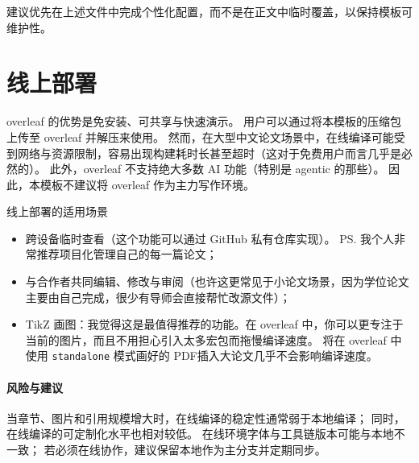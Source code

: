 建议优先在上述文件中完成个性化配置，而不是在正文中临时覆盖，以保持模板可维护性。

\section{线上部署}

\gls{overleaf} 的优势是免安装、可共享与快速演示。
用户可以通过将本模板的压缩包上传至 \gls{overleaf} 并解压来使用。
然而，在大型中文论文场景中，在线编译可能受到网络与资源限制，容易出现构建耗时长甚至超时（这对于免费用户而言几乎是必然的）。
此外，\gls{overleaf} 不支持绝大多数 AI 功能（特别是 agentic 的那些）。
因此，本模板不建议将 \gls{overleaf} 作为主力写作环境。

\begin{mynote}{线上部署的适用场景}
\begin{itemize}
  \item 跨设备临时查看（这个功能可以通过 GitHub 私有仓库实现）。
  PS. 我个人非常推荐项目化管理自己的每一篇论文；
  \item 与合作者共同编辑、修改与审阅（也许这更常见于小论文场景，因为学位论文主要由自己完成，很少有导师会直接帮忙改源文件）；
  \item TikZ 画图：我觉得这是最值得推荐的功能。在 \gls{overleaf} 中，你可以更专注于当前的图片，而且不用担心引入太多宏包而拖慢编译速度。
  将在 \gls{overleaf} 中使用 \texttt{standalone} 模式画好的 PDF插入大论文几乎不会影响编译速度。
\end{itemize}
\end{mynote}

\paragraph{风险与建议}
当章节、图片和引用规模增大时，在线编译的稳定性通常弱于本地编译；
同时，在线编译的可定制化水平也相对较低。
在线环境字体与工具链版本可能与本地不一致；
若必须在线协作，建议保留本地作为主分支并定期同步。